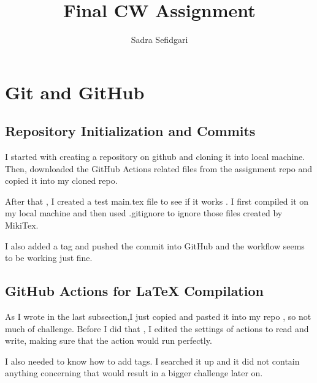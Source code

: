 \documentclass[titlepage]{article}
\title{Final CW Assignment}
\author{Sadra Sefidgari}
\begin{document}
\maketitle

\section{Git and GitHub}
\subsection{Repository Initialization and Commits}
I started with creating a repository on github and cloning it into local machine.
Then, downloaded the GitHub Actions related files from the assignment repo and copied it into my cloned repo.

After that , I created a test main.tex file to see if it works .
I first compiled it on my local machine and then used .gitignore to ignore those files created by MikiTex.

I also added a tag and pushed the commit into GitHub and the workflow seems to be working just fine.
\subsection{GitHub Actions for LaTeX Compilation}

As I wrote in the last subsection,I just copied and pasted it into my repo , so not much of challenge.
Before I did that , I edited the settings of actions to read and write, making sure that the action would run perfectly.

I also needed to know how to add tags. I searched it up and it did not contain anything concerning that would result in a bigger challenge later on.



  
\end{document}
